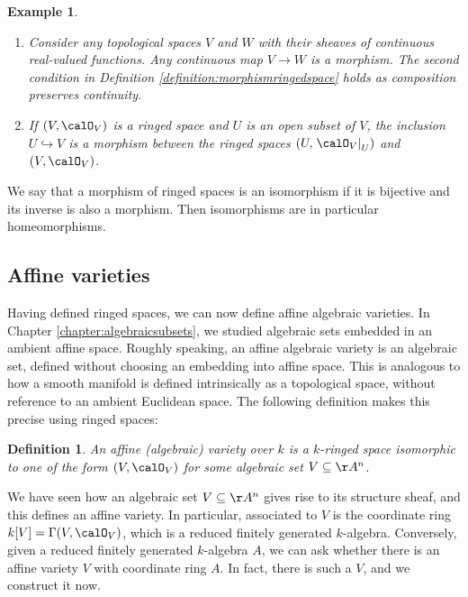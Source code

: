 \documentclass[12pt]{amsart}
\theoremstyle{plain}
\newtheorem{definition}[theorem]{Definition}
\newtheorem{example}[theorem]{Example}
\begin{document}
\begin{example}
\begin{enumerate}
\item
Consider any topological spaces $V$ and $W$ with their sheaves of continuous real-valued functions.
Any continuous map $V \to W$ is a morphism. The second condition in Definition \ref{definition:morphismringedspace} holds as composition preserves continuity.

\item
If $(V, \calO_V)$ is a ringed space and $U$ is an open subset of $V$, the inclusion $U \hookrightarrow V$ is a morphism between the ringed spaces $(U, \left. \calO_V\right|_U)$ and $(V, \calO_V)$.
\end{enumerate}
\end{example}

We say that a morphism of ringed spaces is an isomorphism if it is bijective and its inverse is also a morphism.
Then isomorphisms are in particular homeomorphisms.





\subsection{Affine varieties}
Having defined ringed spaces, we can now define affine algebraic varieties.
In Chapter \ref{chapter:algebraicsubsets}, we studied algebraic sets embedded in an ambient affine space.
Roughly speaking, an affine algebraic variety is an algebraic set, defined without choosing an embedding into affine space.
This is analogous to how a smooth manifold is defined intrinsically as a topological space, without reference to an ambient Euclidean space.
The following definition makes this precise using ringed spaces:

\begin{definition}
An affine (algebraic) variety over $k$ is a $k$-ringed space isomorphic to one of the form $(V, \calO_V)$ for some algebraic set $V \subseteq \AA^n$.
\end{definition}


We have seen how an algebraic set $V \subseteq \AA^n$ gives rise to its structure sheaf, and this defines an affine variety.
In particular, associated to $V$ is the coordinate ring $k[V] = \Gamma(V, \calO_V)$, which is a reduced finitely generated $k$-algebra.
Conversely, given a reduced finitely generated $k$-algebra $A$, we can ask whether there is an affine variety $V$ with coordinate ring $A$.
In fact, there is such a $V$, and we construct it now.
\end{document}
